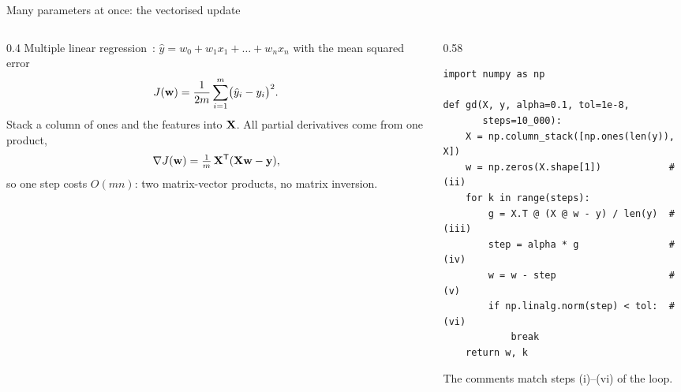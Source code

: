 \begin{frame}[fragile]{Many parameters at once: the vectorised update}
  \begin{columns}[T]
    \begin{column}{0.4\textwidth}
      \small
      Multiple linear regression~\cite{chapra}: $\hat y = w_0 + w_1x_1 + \dots + w_nx_n$ with the mean squared error
      \[
        J(\mathbf{w}) = \frac{1}{2m}\sum_{i=1}^{m}\bigl(\hat y_i - y_i\bigr)^2 .
      \]
      Stack a column of ones and the features into $\mathbf{X}$. All partial derivatives come from one product,
      \[
        \nabla J(\mathbf{w}) = \tfrac1m\,\mathbf{X}^{\mathsf T}(\mathbf{X}\mathbf{w} - \mathbf{y}),
      \]
      so one step costs $O(mn)$: two matrix-vector products, no matrix inversion.
    \end{column}
    \begin{column}{0.58\textwidth}
\begin{lstlisting}[style=py]
import numpy as np

def gd(X, y, alpha=0.1, tol=1e-8,
       steps=10_000):
    X = np.column_stack([np.ones(len(y)), X])
    w = np.zeros(X.shape[1])            # (ii)
    for k in range(steps):
        g = X.T @ (X @ w - y) / len(y)  # (iii)
        step = alpha * g                # (iv)
        w = w - step                    # (v)
        if np.linalg.norm(step) < tol:  # (vi)
            break
    return w, k
\end{lstlisting}
      \footnotesize The comments match steps (i)--(vi) of the loop.
    \end{column}
  \end{columns}
\end{frame}
